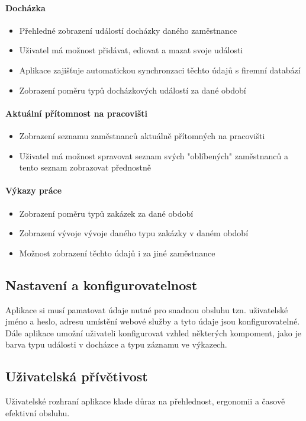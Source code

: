 \documentclass{diplomka}
\begin{document}
\paragraph{Docházka}
\begin{itemize}
\item Přehledné zobrazení událostí docházky daného zaměstnance
\item Uživatel má možnost přidávat, ediovat a mazat svoje události
\item Aplikace zajišťuje automatickou synchronzaci těchto údajů s firemní databází
\item Zobrazení poměru typů docházkových událostí za dané období
\end{itemize}
\paragraph{Aktuální přítomnost na pracovišti}
\begin{itemize}
\item Zobrazení seznamu zaměstnanců aktuálně přítomných na pracovišti
\item Uživatel má možnost spravovat seznam svých "oblíbených" zaměstnanců a tento seznam zobrazovat přednostně
\end{itemize}
\paragraph{Výkazy práce}
\begin{itemize}
\item Zobrazení poměru typů zakázek za dané období
\item Zobrazení vývoje vývoje daného typu zakázky v daném období 
\item Možnost zobrazení těchto údajů i za jiné zaměstnance
\end{itemize}

\subsection{Nastavení a konfigurovatelnost}
Aplikace si musí pamatovat údaje nutné pro snadnou obsluhu tzn. uživatelské jméno a heslo, adresu umístění webové služby a tyto údaje jsou konfigurovatelné.\\
Dále aplikace umožní uživateli konfigurovat vzhled některých kompoment, jako je barva typu události v docházce a typu záznamu ve výkazech.

\subsection{Uživatelská přívětivost}
Uživatelské rozhraní aplikace klade důraz na přehlednost, ergonomii a časově efektivní obsluhu.
\end{document}
